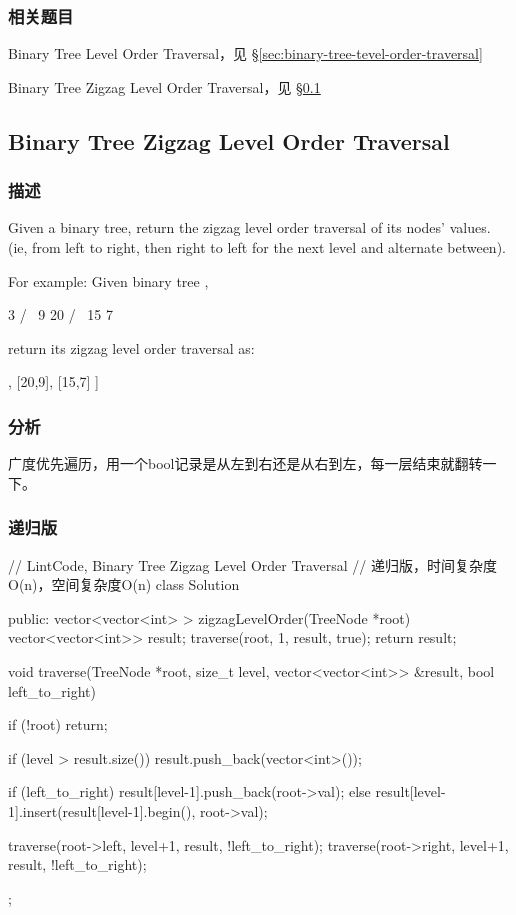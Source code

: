 \subsubsection{相关题目}
\begindot
\item Binary Tree Level Order Traversal，见 \S \ref{sec:binary-tree-tevel-order-traversal}
\item Binary Tree Zigzag Level Order Traversal，见 \S \ref{sec:binary-tree-zigzag-level-order-traversal}
\myenddot


\subsection{Binary Tree Zigzag Level Order Traversal}
\label{sec:binary-tree-zigzag-level-order-traversal}


\subsubsection{描述}
Given a binary tree, return the zigzag level order traversal of its nodes' values. (ie, from left to right, then right to left for the next level and alternate between).

For example:
Given binary tree ,
\begin{Code}
    3
   / \
  9  20
    /  \
   15   7
\end{Code}
return its zigzag level order traversal as:
\begin{Code}
[
  [3],
  [20,9],
  [15,7]
]
\end{Code}


\subsubsection{分析}
广度优先遍历，用一个bool记录是从左到右还是从右到左，每一层结束就翻转一下。


\subsubsection{递归版}
\begin{Code}
// LintCode, Binary Tree Zigzag Level Order Traversal
// 递归版，时间复杂度O(n)，空间复杂度O(n)
class Solution {
public:
    vector<vector<int> > zigzagLevelOrder(TreeNode *root) {
        vector<vector<int>> result;
        traverse(root, 1, result, true);
        return result;
    }

    void traverse(TreeNode *root, size_t level, vector<vector<int>> &result,
            bool left_to_right) {
        if (!root) return;

        if (level > result.size())
            result.push_back(vector<int>());

        if (left_to_right)
            result[level-1].push_back(root->val);
        else
            result[level-1].insert(result[level-1].begin(), root->val);

        traverse(root->left, level+1, result, !left_to_right);
        traverse(root->right, level+1, result, !left_to_right);
    }
};
\end{Code}

